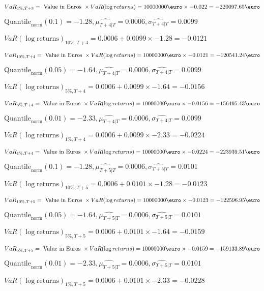 $VaR_{1\%, T + 3} = \text{ Value in Euros } \times VaR(\log returns) = 10 000 000 \text{\euro} \times-0.022 = -220097.65 \text{\euro}$


$\text{Quantile}_\text{norm}(0.1) = -1.28,\hat{\mu_{T+4|T}} = 0.0006, \hat{\sigma_{T+4|T}} = 0.0099$

$VaR(\log \text{returns})_{10\%, T + 4} = 0.0006 + 0.0099\times-1.28 = -0.0121$

$VaR_{10\%, T + 4} = \text{ Value in Euros } \times VaR(\log returns) = 10 000 000 \text{\euro} \times-0.0121 = -120541.24 \text{\euro}$


$\text{Quantile}_\text{norm}(0.05) = -1.64,\hat{\mu_{T+4|T}} = 0.0006, \hat{\sigma_{T+4|T}} = 0.0099$

$VaR(\log \text{returns})_{5\%, T + 4} = 0.0006 + 0.0099\times-1.64 = -0.0156$

$VaR_{5\%, T + 4} = \text{ Value in Euros } \times VaR(\log returns) = 10 000 000 \text{\euro} \times-0.0156 = -156495.43 \text{\euro}$


$\text{Quantile}_\text{norm}(0.01) = -2.33,\hat{\mu_{T+4|T}} = 0.0006, \hat{\sigma_{T+4|T}} = 0.0099$

$VaR(\log \text{returns})_{1\%, T + 4} = 0.0006 + 0.0099\times-2.33 = -0.0224$

$VaR_{1\%, T + 4} = \text{ Value in Euros } \times VaR(\log returns) = 10 000 000 \text{\euro} \times-0.0224 = -223939.51 \text{\euro}$


$\text{Quantile}_\text{norm}(0.1) = -1.28,\hat{\mu_{T+5|T}} = 0.0006, \hat{\sigma_{T+5|T}} = 0.0101$

$VaR(\log \text{returns})_{10\%, T + 5} = 0.0006 + 0.0101\times-1.28 = -0.0123$

$VaR_{10\%, T + 5} = \text{ Value in Euros } \times VaR(\log returns) = 10 000 000 \text{\euro} \times-0.0123 = -122596.95 \text{\euro}$


$\text{Quantile}_\text{norm}(0.05) = -1.64,\hat{\mu_{T+5|T}} = 0.0006, \hat{\sigma_{T+5|T}} = 0.0101$

$VaR(\log \text{returns})_{5\%, T + 5} = 0.0006 + 0.0101\times-1.64 = -0.0159$

$VaR_{5\%, T + 5} = \text{ Value in Euros } \times VaR(\log returns) = 10 000 000 \text{\euro} \times-0.0159 = -159133.89 \text{\euro}$


$\text{Quantile}_\text{norm}(0.01) = -2.33,\hat{\mu_{T+5|T}} = 0.0006, \hat{\sigma_{T+5|T}} = 0.0101$

$VaR(\log \text{returns})_{1\%, T + 5} = 0.0006 + 0.0101\times-2.33 = -0.0228$

